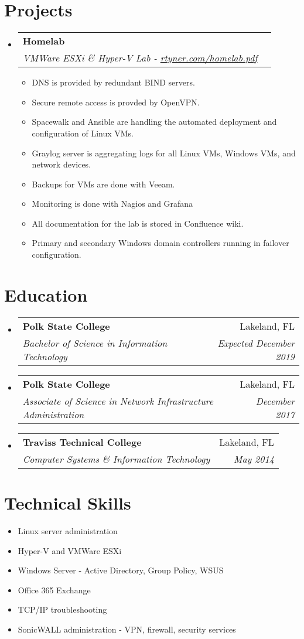 \documentclass[letterpaper,11pt]{article}
\makeatletter
\newcommand{\resumeItem}[2]{
  \item\small{
    \textbf{}{#2 \vspace{-2pt}}
  }
}
\newcommand{\resumeSubheading}[4]{
  \vspace{-1pt}\item
    \begin{tabular*}{0.97\textwidth}{l@{\extracolsep{\fill}}r}
      \textbf{#1} & #2 \\
      \textit{\small#3} & \textit{\small #4} \\
    \end{tabular*}\vspace{-5pt}
}
\newcommand{\resumeSubItem}[2]{\resumeItem{#1}{#2}\vspace{-4pt}}
\newcommand{\resumeSubHeadingListStart}{\begin{itemize}[leftmargin=*]}
\newcommand{\resumeSubHeadingListEnd}{\end{itemize}}
\newcommand{\resumeItemListStart}{\begin{itemize}}
\newcommand{\resumeItemListEnd}{\end{itemize}\vspace{-5pt}}
\makeatother
\begin{document}
\section{Projects}
  \resumeSubHeadingListStart
    \resumeSubheading
      {Homelab}{}
      {VMWare ESXi \& Hyper-V Lab - \href{https://rtyner.com/homelab.pdf}{rtyner.com/homelab.pdf}}{}
      \resumeItemListStart
        \resumeItem{}
          {DNS is provided by redundant BIND servers.}
        \resumeItem{}
          {Secure remote access is provded by OpenVPN.}
        \resumeItem{}
          {Spacewalk and Ansible are handling the automated deployment and configuration of Linux VMs.}
        \resumeItem{}
          {Graylog server is aggregating logs for all Linux VMs, Windows VMs, and network devices.}
        \resumeItem{}
          {Backups for VMs are done with Veeam.}
        \resumeItem{}
          {Monitoring is done with Nagios and Grafana}
        \resumeItem{}
          {All documentation for the lab is stored in Confluence wiki.}
        \resumeItem{}
          {Primary and secondary Windows domain controllers running in failover configuration.}
      \resumeItemListEnd
  \resumeSubHeadingListEnd
\section{Education}
  \resumeSubHeadingListStart
    \resumeSubheading
      {Polk State College}{Lakeland, FL}
      {Bachelor of Science in Information Technology}{Expected December 2019}
    \resumeSubheading
      {Polk State College}{Lakeland, FL}
      {Associate of Science in Network Infrastructure Administration}{December 2017}
    \resumeSubheading
      {Traviss Technical College}{Lakeland, FL}
      {Computer Systems \& Information Technology}{May 2014}
  \resumeSubHeadingListEnd

\section{Technical Skills}
  \resumeSubHeadingListStart
    \resumeSubItem{}
      {Linux server administration}
    \resumeSubItem{}
      {Hyper-V and VMWare ESXi}    
    \resumeSubItem{}
      {Windows Server - Active Directory, Group Policy, WSUS}
    \resumeSubItem{}
      {Office 365 Exchange}
    \resumeSubItem{}
      {TCP/IP troubleshooting}
    \resumeSubItem{}
      {SonicWALL administration - VPN, firewall, security services}
  \resumeSubHeadingListEnd
\end{document}
